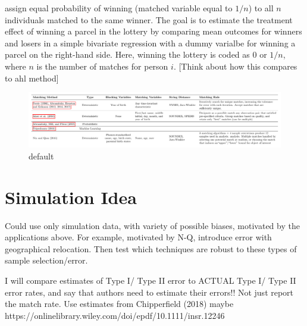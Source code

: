 \documentclass[12pt]{article}
\begin{document}
\cite{bleakley2016} assign equal probability of winning (matched variable equal to $1/n$) to all $n$ individuals matched to the same winner.  The goal is to estimate the treatment effect of winning a parcel in the lottery by comparing mean outcomes for winners and losers in a simple bivariate regression with a dummy varialbe for winning a parcel on the right-hand side.   Here, winning the lottery is coded as $0$ or $1/n$, where $n$ is the number of matches for person $i$. [Think about how this compares to ahl method]


\begin{figure}[htbp]
\begin{center}
\includegraphics[width=\textwidth]{methods_table.pdf}
\caption{default}
\label{default}
\end{center}
\end{figure}

\section*{Simulation Idea}
Could use only simulation data, with variety of possible biases, motivated by the applications above.  For example, motivated by  N-Q, introduce error with geographical relocation.  Then test which techniques are robust to these types of sample selection/error.   

I will compare estimates of Type I/ Type II error to ACTUAL Type I/ Type II error rates, and say that authors need to estimate their errors!! Not just report the match rate.   Use estimates from Chipperfield (2018) maybe https://onlinelibrary.wiley.com/doi/epdf/10.1111/insr.12246

 

\end{document}
